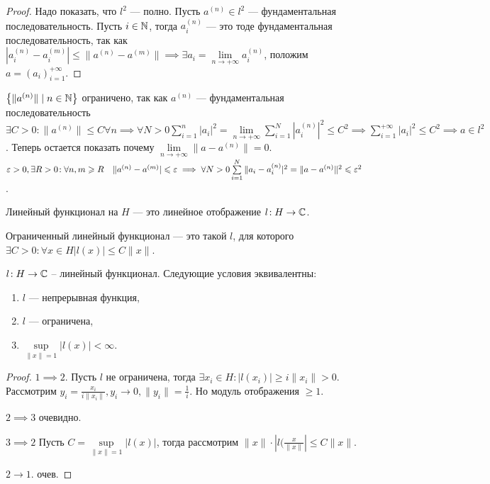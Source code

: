 \begin{proof}
    Надо показать, что $l^2$ --- полно.  Пусть  $a^{(n)} \in l^2$ --- фундаментальная последовательность. Пусть $i \in \mathbb{N}$, тогда  $a_i^{(n)}$ --- это тоде фундаментальная последовательность, так как $\left| a_i^{(n)} - a_i^{(m)} \right| \le  \| a^{(n)} - a^{(m)}\| \implies \exists a_i = \lim\limits_{n \to +\infty} a_i^{(n)}$, положим $a = (a_i)_{i=1}^{+\infty}$.
\end{proof}
\begin{remark}
    $\left\{ \|a^{(n)}\| \mid n \in \mathbb{N} \right\}$ ограничено, так как  $a^{(n)}$ --- фундаментальная последовательность $\exists C > 0\!: \|a^{(n)}\| \le  C \forall n \implies \forall N >0 \sum\limits_{i=1}^{n} |a_i|^2 = \lim\limits_{n \to +\infty} \sum\limits_{i = 1}^N \left| a_i^{(n)} \right|^2 \le  C^2 \implies \sum\limits_{i = 1}^{+\infty} |a_i|^2 \le  C^2 \implies a \in l^2$.
    Теперь остается показать почему $\lim\limits_{n \to +\infty} \|a - a^{(n)}\| = 0$. $\varepsilon > 0, \exists R >0\!: \forall n, m \geqslant R \quad \|a^{(n)} - a^{(m)} | \leqslant \varepsilon \implies \forall N >0 \sum\limits_{i = 1}^N \|a_i - a_i^{(n)}|^2 = \|a - a^{(n)}\|^2 \leqslant \varepsilon^2$. 
\end{remark}
\begin{definition}
    Линейный функционал на $H$ --- это линейное отображение $l\!: H \to \mathbb{C}$. 

    Ограниченный линейный функционал --- это такой $l$, для которого $\exists C > 0\!: \forall x \in H \left| l(x) \right| \le  C\|x\|$. 
\end{definition}
\begin{lemma}
    $l\!: H \to \mathbb{C}$ -- линейный функционал. Следующие условия эквивалентны:
     \begin{enumerate}
         \item $l$ --- непрерывная функция,
         \item $l$ --- ограничена,
         \item  $\sup\limits_{\|x\|=1} |l(x)| < \infty$.
    \end{enumerate}
\end{lemma}
\begin{proof}
    $1 \implies 2$. Пусть $l$ не ограничена, тогда  $\exists x_i \in H\!: |l(x_i)| \ge  i \|x_i\| > 0$. Рассмотрим $y_i = \frac{x_i}{i \|x_i\|}, y_i \to 0, \|y_i\| = \frac{1}{i}$. Но модуль отображения $\ge 1$.

    $2 \implies 3$ очевидно.

     $3 \implies 2$ Пусть $C = \sup\limits_{\|x\| = 1} |l(x)|$, тогда рассмотрим $\|x\| \cdot \left| l(\frac{x}{\|x\|} \right| \le  C\|x\|$.

     $2 \to 1$. очев.
\end{proof}
